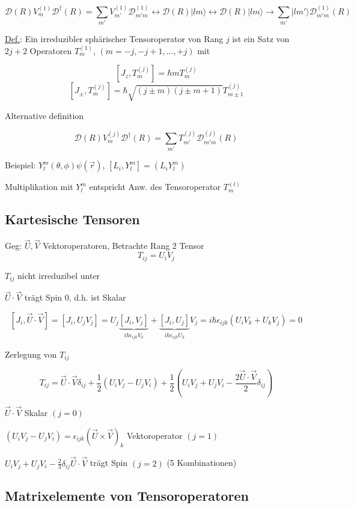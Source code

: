 \[\mathcal D (R) V^{(1)}_m \mathcal D^\dagger(R)=\sum_{m'}V^{(1)}_{m'}\mathcal D^{(1)}_{m'm} \leftrightarrow
\mathcal D (R)|lm\rangle  \leftrightarrow \mathcal D (R)|lm\rangle
\rightarrow \sum_{m'}|lm'\rangle \mathcal D^{(1)}_{m'm}(R)\]

\underline{Def.}: Ein irreduzibler sphärischer Tensoroperator von Rang
\(j\) ist ein Satz von \(2j+2\) Operatoren \(T^{(1)}_m\),
\((m=-j,-j+1,...,+j)\) mit 

\[ [J_z,T^{(j)}_m] = \hbar m T^{(j)}_m \]
\[ [J_\pm,T^{(j)}_m] = \hbar\sqrt{(j\pm m)(j\pm m+1)} T^{(j)}_{m\pm 1} \]

Alternative definition 

\[ \mathcal D (R) V^{(j)}_m \mathcal D^\dagger(R) =
\sum_{m'}T^{(j)}_{m'}\mathcal D^{(j)}_{m'm}(R) \]

Beispiel: \(Y^m_l(\theta,\phi)\psi(\vec r)\), \([L_i,Y^m_l]=(L_i Y^m_l)\)


Multiplikation mit \(Y^m_l\) entspricht Anw. des Tensoroperator \(T^{(l)}_m\)

\subsection{Kartesische Tensoren}

Geg: \(\vec U, \vec V\) Vektoroperatoren, Betrachte Rang 2 Tensor
\[ T_{ij} = U_iV_j \]

\(T_{ij}\) nicht irreduzibel unter 


\(\vec U \cdot \vec V\) trägt Spin 0, d.h. ist Skalar 

\[[J_i,\vec U \cdot \vec
V]=[J_i,U_jV_j]=U_j\underbrace{[J_i,V_j]}_{i\hbar\epsilon_{ijk}V_k}+
\underbrace{[J_i,U_j]}_{i\hbar\epsilon_{ijk}U_k} V_j =
i\hbar\epsilon_{ijk}(U_iV_k+U_kV_j) = 0\]

Zerlegung von \(T_{ij}\)

\[T_{ij}= \vec U \cdot \vec V\delta_{ij} + \frac 1 2(U_iV_j-U_jV_i)+ \frac 1 2(U_iV_j+U_jV_i - \frac{2 \vec U \cdot \vec V}{2} \delta_{ij})
\]

\( \vec U \cdot \vec V \) Skalar \((j=0)\)

\((U_iV_j-U_jV_i) = \epsilon_{ijk}(\vec U \times \vec V)_k \) Vektoroperator \((j=1)\)

\(U_iV_j+U_jV_i-\frac 2 3 \delta_{ij} \vec U \cdot \vec V \) trägt Spin
\((j=2)\) (5 Kombinationen)


\subsection{Matrixelemente von Tensoroperatoren}

